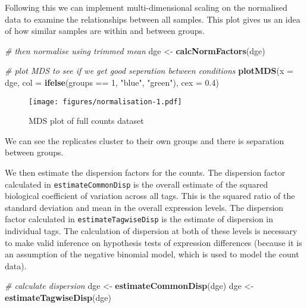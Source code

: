 \documentclass[]{article}
\newenvironment{Shaded}{\begin{snugshade}}{\end{snugshade}}
\newcommand{\KeywordTok}[1]{\textcolor[rgb]{0.13,0.29,0.53}{\textbf{{#1}}}}
\newcommand{\DataTypeTok}[1]{\textcolor[rgb]{0.13,0.29,0.53}{{#1}}}
\newcommand{\DecValTok}[1]{\textcolor[rgb]{0.00,0.00,0.81}{{#1}}}
\newcommand{\FloatTok}[1]{\textcolor[rgb]{0.00,0.00,0.81}{{#1}}}
\newcommand{\StringTok}[1]{\textcolor[rgb]{0.31,0.60,0.02}{{#1}}}
\newcommand{\CommentTok}[1]{\textcolor[rgb]{0.56,0.35,0.01}{\textit{{#1}}}}
\newcommand{\NormalTok}[1]{{#1}}
\begin{document}
Following this we can implement multi-dimensional scaling on the
normalised data to examine the relationships between all samples. This
plot gives us an idea of how similar samples are within and between
groups.

\begin{Shaded}
\begin{Highlighting}[]
\CommentTok{# then normalise using trimmed mean}
\NormalTok{dge <-}\StringTok{ }\KeywordTok{calcNormFactors}\NormalTok{(dge)}

\CommentTok{# plot MDS to see if we get good seperation between conditions}
\KeywordTok{plotMDS}\NormalTok{(}\DataTypeTok{x =} \NormalTok{dge, }\DataTypeTok{col =} \KeywordTok{ifelse}\NormalTok{(groups ==}\StringTok{ }\DecValTok{1}\NormalTok{, }\StringTok{"blue"}\NormalTok{, }\StringTok{"green"}\NormalTok{), }\DataTypeTok{cex =} \FloatTok{0.4}\NormalTok{)}
\end{Highlighting}
\end{Shaded}

\begin{figure}[htbp]
\centering
\texttt{[image: figures/normalisation-1.pdf]}
\caption{MDS plot of full counts dataset}
\end{figure}

We can see the replicates cluster to their own groups and there is
separation between groups.

We then estimate the dispersion factors for the counts. The dispersion
factor calculated in \texttt{estimateCommonDisp} is the overall estimate
of the squared biological coefficient of variation across all tags. This
is the squared ratio of the standard deviation and mean in the overall
expression levels. The dispersion factor calculated in
\texttt{estimateTagwiseDisp} is the estimate of dispersion in individual
tags. The calculation of dispersion at both of these levels is necessary
to make valid inference on hypothesis tests of expression differences
(because it is an assumption of the negative binomial model, which is
used to model the count data).

\begin{Shaded}
\begin{Highlighting}[]
\CommentTok{# calculate dispersion}
\NormalTok{dge <-}\StringTok{ }\KeywordTok{estimateCommonDisp}\NormalTok{(dge)}
\NormalTok{dge <-}\StringTok{ }\KeywordTok{estimateTagwiseDisp}\NormalTok{(dge)}
\end{Highlighting}
\end{Shaded}
\end{document}
